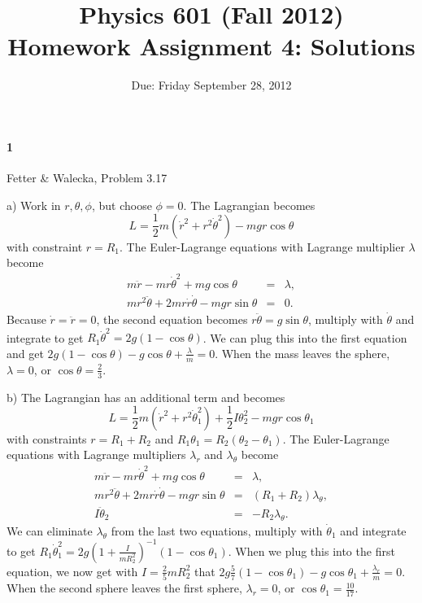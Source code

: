 \documentclass[letterpaper,11pt]{article}
\title{Physics 601 (Fall 2012) \\ Homework Assignment 4: Solutions}
\date{Due: Friday September 28, 2012}
\begin{document}
\maketitle

\paragraph*{1} Fetter \& Walecka, Problem 3.17

a) Work in $r,\theta,\phi$, but choose $\phi = 0$.  The Lagrangian becomes
\begin{equation*}
 L = \frac{1}{2}m(\dot{r}^2+r^2\dot{\theta}^2) - m g r \cos\theta
\end{equation*}
with constraint $r = R_1$.  The Euler-Lagrange equations with Lagrange multiplier $\lambda$ become
\begin{eqnarray*}
 m\ddot{r} - m r \dot{\theta}^2 + m g \cos\theta & = & \lambda, \\
 m r^2 \ddot\theta + 2 m r \dot{r} \dot\theta - m g r \sin\theta & = & 0.
\end{eqnarray*}
Because $\dot{r} = \ddot{r} = 0$, the second equation becomes $r \ddot\theta = g \sin\theta$, multiply with $\dot\theta$ and integrate to get $R_1 \dot\theta^2 = 2 g (1 - \cos\theta)$.  We can plug this into the first equation and get $2 g (1 - \cos\theta) - g \cos\theta + \frac{\lambda}{m} = 0$.  When the mass leaves the sphere, $\lambda = 0$, or $\cos\theta = \frac{2}{3}$.

b) The Lagrangian has an additional term and becomes
\begin{equation*}
 L = \frac{1}{2}m(\dot{r}^2+r^2\dot\theta_1^2) + \frac{1}{2} I \theta_2^2 - m g r \cos\theta_1
\end{equation*}
with constraints $r = R_1 + R_2$ and $R_1 \theta_1 = R_2 (\theta_2 - \theta_1)$.  The Euler-Lagrange equations with Lagrange multipliers $\lambda_r$ and $\lambda_\theta$ become
\begin{eqnarray*}
 m\ddot{r} - m r \dot{\theta}^2 + m g \cos\theta & = & \lambda, \\
 m r^2 \ddot\theta + 2 m r \dot{r} \dot\theta - m g r \sin\theta & = & (R_1 + R_2) \lambda_\theta, \\
 I \ddot\theta_2 & = & -R_2 \lambda_\theta.
\end{eqnarray*}
We can eliminate $\lambda_\theta$ from the last two equations, multiply with $\dot\theta_1$ and integrate to get $R_1 \dot\theta_1^2 = 2 g (1 + \frac{I}{m R_2^2})^{-1} (1 - \cos\theta_1)$.  When we plug this into the first equation, we now get with $I = \frac{2}{5} m R_2^2$ that $2 g \frac{5}{7} (1 - \cos\theta_1) - g \cos\theta_1 + \frac{\lambda_r}{m} = 0$.  When the second sphere leaves the first sphere, $\lambda_r = 0$, or $\cos\theta_1 = \frac{10}{17}$.
\end{document}
